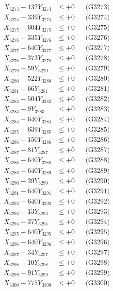 \documentclass[a4paper,10pt]{article}
\begin{document}
{\begin{align}
X_{3273} - 132Y_{3273} &\leq +0 && \text{(G3273)} \\
X_{3274} - 339Y_{3274} &\leq +0 && \text{(G3274)} \\
X_{3275} - 604Y_{3275} &\leq +0 && \text{(G3275)} \\
X_{3276} - 335Y_{3276} &\leq +0 && \text{(G3276)} \\
X_{3277} - 640Y_{3277} &\leq +0 && \text{(G3277)} \\
X_{3278} - 373Y_{3278} &\leq +0 && \text{(G3278)} \\
X_{3279} - 59Y_{3279} &\leq +0 && \text{(G3279)} \\
X_{3280} - 522Y_{3280} &\leq +0 && \text{(G3280)} \\
\allowbreak
X_{3281} - 66Y_{3281} &\leq +0 && \text{(G3281)} \\
X_{3282} - 504Y_{3282} &\leq +0 && \text{(G3282)} \\
X_{3283} - 9Y_{3283} &\leq +0 && \text{(G3283)} \\
X_{3284} - 640Y_{3284} &\leq +0 && \text{(G3284)} \\
X_{3285} - 639Y_{3285} &\leq +0 && \text{(G3285)} \\
X_{3286} - 150Y_{3286} &\leq +0 && \text{(G3286)} \\
X_{3287} - 81Y_{3287} &\leq +0 && \text{(G3287)} \\
X_{3288} - 640Y_{3288} &\leq +0 && \text{(G3288)} \\
X_{3289} - 640Y_{3289} &\leq +0 && \text{(G3289)} \\
X_{3290} - 39Y_{3290} &\leq +0 && \text{(G3290)} \\
\allowbreak
X_{3291} - 640Y_{3291} &\leq +0 && \text{(G3291)} \\
X_{3292} - 640Y_{3292} &\leq +0 && \text{(G3292)} \\
X_{3293} - 13Y_{3293} &\leq +0 && \text{(G3293)} \\
X_{3294} - 37Y_{3294} &\leq +0 && \text{(G3294)} \\
X_{3295} - 640Y_{3295} &\leq +0 && \text{(G3295)} \\
X_{3296} - 640Y_{3296} &\leq +0 && \text{(G3296)} \\
X_{3297} - 34Y_{3297} &\leq +0 && \text{(G3297)} \\
X_{3298} - 10Y_{3298} &\leq +0 && \text{(G3298)} \\
X_{3299} - 91Y_{3299} &\leq +0 && \text{(G3299)} \\
X_{3300} - 775Y_{3300} &\leq +0 && \text{(G3300)} \\

\end{align}}
\end{document}
